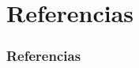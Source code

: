 \documentclass[aspectratio=169,10pt,usenames,dvipsnames,spanish]{beamer}
\begin{document}
\section{Referencias}
\begin{frame}[allowframebreaks]
\frametitle{Referencias}
\scriptsize
%
\printbibliography
\end{frame}
\end{document}
